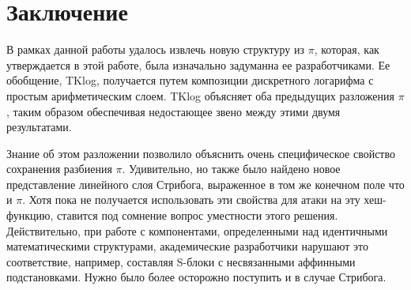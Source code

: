 \section{Заключение}
В рамках данной работы удалось извлечь новую структуру из \(\pi\), которая, как утверждается в этой работе, была изначально задуманна ее разработчиками. Ее обобщение, TKlog, получается путем композиции дискретного логарифма с простым арифметическим слоем. TKlog объясняет оба предыдущих разложения \(\pi\), таким образом обеспечивая недостающее звено между этими двумя результатами.

Знание об этом разложении позволило объяснить очень специфическое свойство сохранения разбиения \(\pi\). Удивительно, но также было найдено новое представление линейного слоя Стрибога, выраженное в том же конечном поле что и \(\pi\). Хотя пока не получается использовать эти свойства для атаки на эту хеш-функцию, ставится под сомнение вопрос уместности этого решения. Действительно, при работе с компонентами, определенными над идентичными математическими структурами, академические разработчики нарушают это соответствие, например, составляя S-блоки с несвязанными аффинными подстановками. Нужно было более осторожно поступить и в случае Стрибога.
